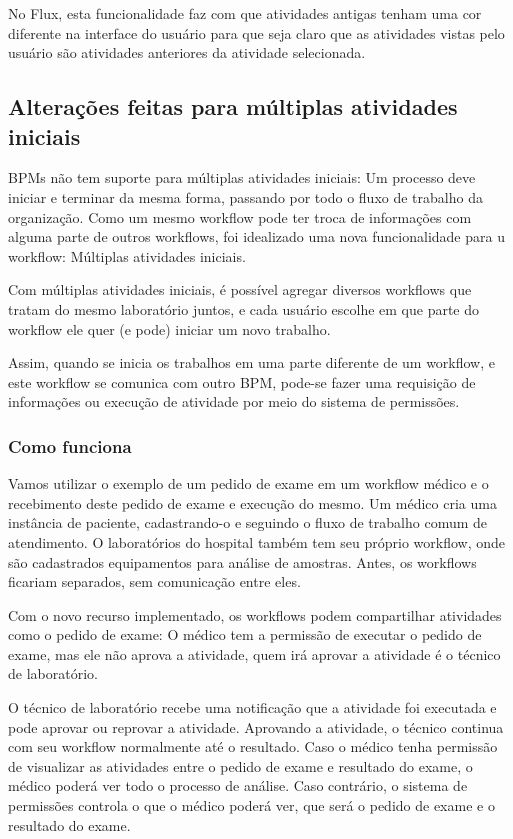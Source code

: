 No Flux, esta funcionalidade faz com que atividades antigas tenham uma cor diferente na interface do usuário para que seja claro que as atividades vistas pelo usuário são atividades anteriores da atividade selecionada.

\subsection{Alterações feitas para múltiplas atividades iniciais}

BPMs não tem suporte para múltiplas atividades iniciais: Um processo deve iniciar e terminar da mesma forma, passando por todo o fluxo de trabalho da organização. \R
Como um mesmo workflow pode ter troca de informações com alguma parte de outros workflows, foi idealizado uma nova funcionalidade para u workflow: Múltiplas atividades iniciais.

Com múltiplas atividades iniciais, é possível agregar diversos workflows que tratam do mesmo laboratório juntos, e cada usuário escolhe em que parte do workflow ele quer (e pode) iniciar um novo trabalho.

Assim, quando se inicia os trabalhos em uma parte diferente de um workflow, e este workflow se comunica com outro BPM, pode-se fazer uma requisição de informações ou execução de atividade por meio do sistema de permissões.

\subsubsection{Como funciona}

Vamos utilizar o exemplo de um pedido de exame em um workflow médico e o recebimento deste pedido de exame e execução do mesmo.
Um médico cria uma instância de paciente, cadastrando-o e seguindo o fluxo de trabalho comum de atendimento.
O laboratórios do hospital também tem seu próprio workflow, onde são cadastrados equipamentos para análise de amostras.
Antes, os workflows ficariam separados, sem comunicação entre eles.

Com o novo recurso implementado, os workflows podem compartilhar atividades como o pedido de exame: O médico tem a permissão de executar o pedido de exame, mas ele não aprova a atividade, quem irá aprovar a atividade é o técnico de laboratório.

O técnico de laboratório recebe uma notificação que a atividade foi executada e pode aprovar ou reprovar a atividade.
Aprovando a atividade, o técnico continua com seu workflow normalmente até o resultado.
Caso o médico tenha permissão de visualizar as atividades entre o pedido de exame e resultado do exame, o médico poderá ver todo o processo de análise.
Caso contrário, o sistema de permissões controla o que o médico poderá ver, que será o pedido de exame e o resultado do exame.

